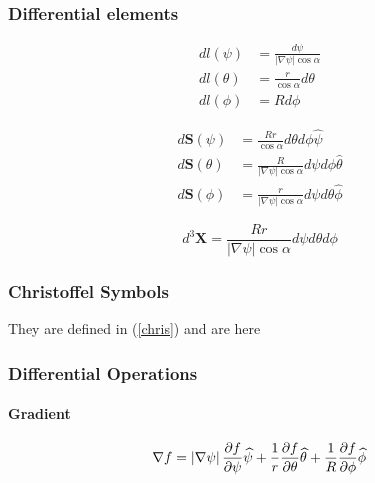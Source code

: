 \subsubsection{Differential elements}

\begin{align}
dl\left( \psi\right) & =\frac{d\psi}{\left| \nabla\psi\right| \cos \alpha} \\
dl\left( \theta\right) & =\frac{r}{\cos\alpha}d\theta  \label{dltheta} \\
dl\left( \phi\right) & =Rd\phi  \label{dlphi}
\end{align}

\begin{align}
d\mathbf{S}\left( \psi \right) & =\frac{Rr}{\cos \alpha }d\theta d\phi 
\widehat{\psi }  \label{dsdthetadphi} \\
d\mathbf{S}\left( \theta \right) & =\frac{R}{\left\vert \nabla \psi
\right\vert \cos \alpha }d\psi d\phi \widehat{\theta } \\
d\mathbf{S}\left( \phi \right) & =\frac{r}{\left\vert \nabla \psi
\right\vert \cos \alpha }d\psi d\theta \widehat{\phi }  \label{dsphipsitheta}
\end{align}

\begin{equation}
d^{3}\mathbf{X}=\frac{Rr}{\left| \nabla\psi\right| \cos\alpha}d\psi d\theta
d\phi  \label{dvpsitheta}
\end{equation}

\subsubsection{Christoffel Symbols}

They are defined in (\ref{chris}) and are here

\subsubsection{Differential Operations}

\paragraph{Gradient}

\begin{equation}
\nabla f=\left| \nabla\psi\right| \frac{\partial f}{\partial\psi}\widehat{%
\psi}+\frac{1}{r}\frac{\partial f}{\partial\theta}\widehat{ \theta }+\frac{1%
}{R}\frac{\partial f}{\partial\phi}\widehat{\phi}
\end{equation}

